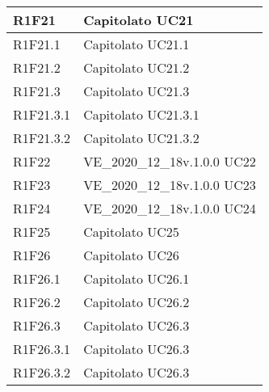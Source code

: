 \begin{center}
\begin{longtable}{|p{22mm}|p{44mm}|}
R1F21 &
Capitolato \newline
UC21 
\\
\hline

R1F21.1 &
Capitolato \newline
UC21.1 
\\
\hline

R1F21.2 &
Capitolato \newline
UC21.2 
\\
\hline

R1F21.3 &
Capitolato \newline
UC21.3 
\\
\hline

R1F21.3.1 &
Capitolato \newline
UC21.3.1 
\\
\hline

R1F21.3.2 &
Capitolato \newline
UC21.3.2 
\\
\hline

R1F22 &
VE\_2020\_12\_18v.1.0.0 \newline
UC22 
\\
\hline

R1F23 &
VE\_2020\_12\_18v.1.0.0 \newline
UC23 
\\
\hline

R1F24 &
VE\_2020\_12\_18v.1.0.0 \newline
UC24 
\\
\hline

R1F25 &
Capitolato \newline
UC25 
\\
\hline

R1F26 &
Capitolato \newline
UC26 
\\
\hline

R1F26.1 &
Capitolato \newline
UC26.1 
\\
\hline

R1F26.2 &
Capitolato \newline
UC26.2 
\\
\hline

R1F26.3 &
Capitolato \newline
UC26.3 
\\
\hline

R1F26.3.1 &
Capitolato \newline
UC26.3 
\\
\hline

R1F26.3.2 &
Capitolato \newline
UC26.3 
\\
\hline


\end{longtable}
\end{center}
